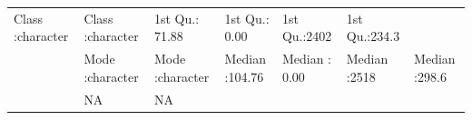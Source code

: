 \documentclass[]{article}
\begin{document}
\begin{longtable}[]{@{}lllllll@{}}
\begin{minipage}[t]{0.14\columnwidth}
Class :character\strut
\end{minipage} & \begin{minipage}[t]{0.14\columnwidth}\raggedright\strut
Class :character\strut
\end{minipage} & \begin{minipage}[t]{0.13\columnwidth}\raggedright\strut
1st Qu.: 71.88\strut
\end{minipage} & \begin{minipage}[t]{0.13\columnwidth}\raggedright\strut
1st Qu.: 0.00\strut
\end{minipage} & \begin{minipage}[t]{0.11\columnwidth}\raggedright\strut
1st Qu.:2402\strut
\end{minipage} & \begin{minipage}[t]{0.12\columnwidth}\raggedright\strut
1st Qu.:234.3\strut
\end{minipage}\tabularnewline
\begin{minipage}[t]{0.03\columnwidth}\raggedright\strut
\strut
\end{minipage} & \begin{minipage}[t]{0.14\columnwidth}\raggedright\strut
Mode :character\strut
\end{minipage} & \begin{minipage}[t]{0.14\columnwidth}\raggedright\strut
Mode :character\strut
\end{minipage} & \begin{minipage}[t]{0.13\columnwidth}\raggedright\strut
Median :104.76\strut
\end{minipage} & \begin{minipage}[t]{0.13\columnwidth}\raggedright\strut
Median : 0.00\strut
\end{minipage} & \begin{minipage}[t]{0.11\columnwidth}\raggedright\strut
Median :2518\strut
\end{minipage} & \begin{minipage}[t]{0.12\columnwidth}\raggedright\strut
Median :298.6\strut
\end{minipage}\tabularnewline
\begin{minipage}[t]{0.03\columnwidth}\raggedright\strut
\strut
\end{minipage} & \begin{minipage}[t]{0.14\columnwidth}\raggedright\strut
NA\strut
\end{minipage} & \begin{minipage}[t]{0.14\columnwidth}\raggedright\strut
NA\strut

\end{minipage}
\end{longtable}
\end{document}
